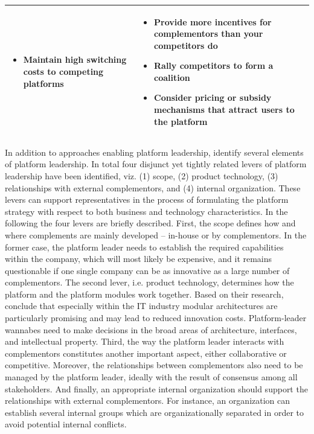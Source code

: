 \begin{table}[t]
\begin{tabular}{L{.45\textwidth}L{.45\textwidth}}
\begin{itemize}[leftmargin=*, parsep=0pt, topsep=0pt, itemsep=0pt]
				\item Maintain high switching costs to competing platforms	\vspace{-\baselineskip} 
			\end{itemize} &
			\vspace{-4mm}
			\footnotesize
			\begin{itemize}[leftmargin=*, parsep=0pt, topsep=0pt, itemsep=0pt]
				\item Provide more incentives for complementors than your competitors do
				\item Rally competitors to form a coalition
				\item Consider pricing or subsidy mechanisms that attract users to the platform \vspace{-\baselineskip} 
			\end{itemize} \\ \bottomrule
	\end{tabular}
\end{table}

In addition to approaches enabling platform leadership, \citet{Cusumano2002} identify several elements of platform leadership. In total four disjunct yet tightly related levers of platform leadership have been identified, viz. (1) scope, (2) product technology, (3) relationships with external complementors, and (4) internal organization. These levers can support representatives in the process of formulating the platform strategy with respect to both business and technology characteristics. In the following the four levers are briefly described. First, the scope defines how and where complements are mainly developed -- in-house or by complementors. In the former case, the platform leader needs to establish the required capabilities within the company, which will most likely be expensive, and it remains questionable if one single company can be as innovative as a large number of complementors. The second lever, i.e. product technology, determines how the platform and the platform modules work together. Based on their research, \citet[pp. 55-56]{Cusumano2002} conclude that especially within the \ac{IT} industry modular architectures are particularly promising and may lead to reduced innovation costs. Platform-leader wannabes need to make decisions in the broad areas of architecture, interfaces, and intellectual property. Third, the way the platform leader interacts with complementors constitutes another important aspect, either collaborative or competitive. Moreover, the relationships between complementors also need to be managed by the platform leader, ideally with the result of consensus among all stakeholders. And finally, an appropriate internal organization should support the relationships with external complementors. For instance, an organization can establish several internal groups which are organizationally separated in order to avoid potential internal conflicts.

